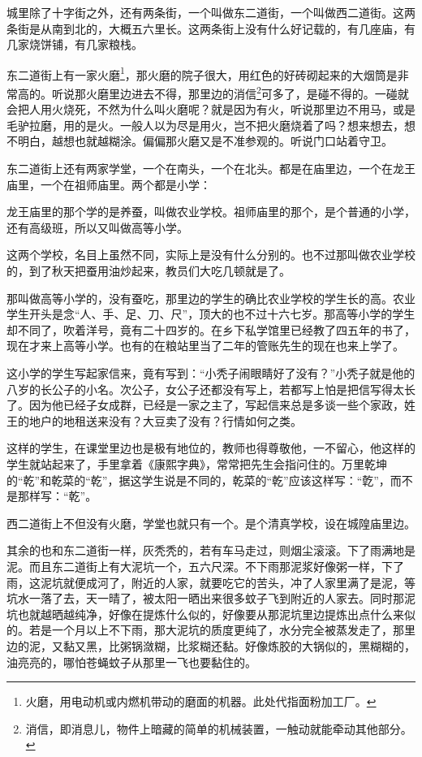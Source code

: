 \par 城里除了十字街之外，还有两条街，一个叫做东二道街，一个叫做西二道街。这两条街是从南到北的，大概五六里长。这两条街上没有什么好记载的，有几座庙，有几家烧饼铺，有几家粮栈。
\par 东二道街上有一家火磨\footnote{火磨，用电动机或内燃机带动的磨面的机器。此处代指面粉加工厂。}，那火磨的院子很大，用红色的好砖砌起来的大烟筒是非常高的。听说那火磨里边进去不得，那里边的消信\footnote{消信，即消息儿，物件上暗藏的简单的机械装置，一触动就能牵动其他部分。}可多了，是碰不得的。一碰就会把人用火烧死，不然为什么叫火磨呢？就是因为有火，听说那里边不用马，或是毛驴拉磨，用的是火。一般人以为尽是用火，岂不把火磨烧着了吗？想来想去，想不明白，越想也就越糊涂。偏偏那火磨又是不准参观的。听说门口站着守卫。
\par 东二道街上还有两家学堂，一个在南头，一个在北头。都是在庙里边，一个在龙王庙里，一个在祖师庙里。两个都是小学：
\par 龙王庙里的那个学的是养蚕，叫做农业学校。祖师庙里的那个，是个普通的小学，还有高级班，所以又叫做高等小学。
\par 这两个学校，名目上虽然不同，实际上是没有什么分别的。也不过那叫做农业学校的，到了秋天把蚕用油炒起来，教员们大吃几顿就是了。
\par 那叫做高等小学的，没有蚕吃，那里边的学生的确比农业学校的学生长的高。农业学生开头是念“人、手、足、刀、尺”，顶大的也不过十六七岁。那高等小学的学生却不同了，吹着洋号，竟有二十四岁的。在乡下私学馆里已经教了四五年的书了，现在才来上高等小学。也有的在粮站里当了二年的管账先生的现在也来上学了。
\par 这小学的学生写起家信来，竟有写到：“小秃子闹眼睛好了没有？”小秃子就是他的八岁的长公子的小名。次公子，女公子还都没有写上，若都写上怕是把信写得太长了。因为他已经子女成群，已经是一家之主了，写起信来总是多谈一些个家政，姓王的地户的地租送来没有？大豆卖了没有？行情如何之类。
\par 这样的学生，在课堂里边也是极有地位的，教师也得尊敬他，一不留心，他这样的学生就站起来了，手里拿着《康熙字典》，常常把先生会指问住的。万里乾坤的“乾”和乾菜的“乾”，据这学生说是不同的，乾菜的“乾”应该这样写：“亁”，而不是那样写：“乾”。
\par 西二道街上不但没有火磨，学堂也就只有一个。是个清真学校，设在城隍庙里边。
\par 其余的也和东二道街一样，灰秃秃的，若有车马走过，则烟尘滚滚。下了雨满地是泥。而且东二道街上有大泥坑一个，五六尺深。不下雨那泥浆好像粥一样，下了雨，这泥坑就便成河了，附近的人家，就要吃它的苦头，冲了人家里满了是泥，等坑水一落了去，天一晴了，被太阳一晒出来很多蚊子飞到附近的人家去。同时那泥坑也就越晒越纯净，好像在提炼什么似的，好像要从那泥坑里边提炼出点什么来似的。若是一个月以上不下雨，那大泥坑的质度更纯了，水分完全被蒸发走了，那里边的泥，又黏又黑，比粥锅潋糊，比浆糊还黏。好像炼胶的大锅似的，黑糊糊的，油亮亮的，哪怕苍蝇蚊子从那里一飞也要黏住的。
